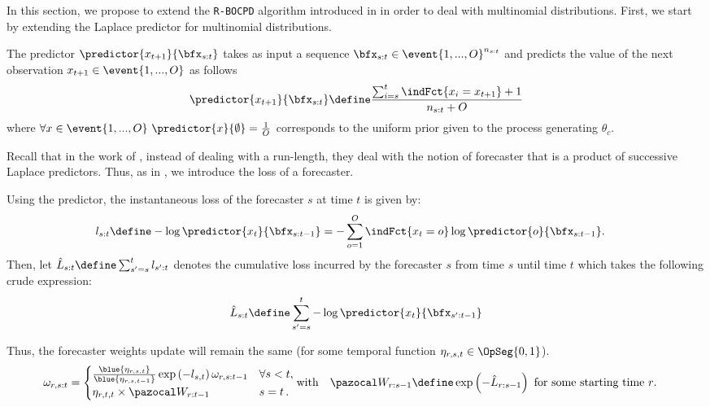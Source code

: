 \documentclass{article} %
\begin{document}
In this section, we propose to extend the \texttt{R-BOCPD} algorithm introduced in \cite{alami20a} in order to deal with multinomial distributions. First, we start by extending the Laplace predictor for multinomial distributions.


\begin{definition}
    \label{LaplacePred}
	The predictor $\predictor{x_{t+1}}{\bfx_{s:t}}$ takes as input a sequence $\bfx_{s:t} \in \event{1,..., O}^{n_{s:t}}$  and predicts the value of the next observation $x_{t+1} \in \event{1,..., O}$ as follows
	\begin{align}
	\predictor{x_{t+1}}{\bfx_{s:t}}  \define 
	\frac{\sum_{i=s}^{t} \indFct{x_i = x_{t+1}}   + 1 }{n_{s:t} + O } 
	\label{Eq::Forecaster}
  \end{align}
		\label{Def_LapPredic}
where $\forall  x \in \event{1,..., O} \ \predictor{x}{\emptyset}  = \frac{1}{O}$ corresponds to the uniform prior given to the process generating  $\theta_c$.
\end{definition}

Recall that in the work of \cite{alami20a}, instead of dealing with a run-length, they deal with the notion of forecaster that is a product of successive Laplace predictors. Thus, as in \cite{alami20a}, we introduce the loss of a forecaster. 

\begin{definition}
Using the predictor, the instantaneous loss of the forecaster $s$ at time $t$ is given by:
\begin{align*}
 l_{s:t} &\define 
 -\log \predictor{x_{t}}{\bfx_{s:t-1}} = - \sum_{o=1}^O \indFct{x_{t} = o}  \log \predictor{o}{\bfx_{s:t-1}}.
\end{align*}
Then, let $\hat{L}_{s:t}\define \sum_{s'=s}^t l_{s':t}$ denotes the cumulative loss incurred by the forecaster $s$ from time $s$ until time $t$ which takes the following crude expression:
\begin{align}
    \hat{L}_{s:t}\define \sum_{s'=s}^t -\log \predictor{x_{t}}{\bfx_{s':t-1}}
    \label{Eq::cumulLoss}
\end{align}
    
\end{definition}

Thus, the forecaster weights update will remain the same (for some temporal function $\eta_{r,s,t}\in \OpSeg{0,1}$).
\begin{align}
    \omega_{r,s:t} & = \begin{cases}
\frac{\blue{\eta_{r,s,t}}}{\blue{\eta_{r,s,t-1}}}	 \exp \left(-l_{s,t} \right) \omega_{r,s:t-1} & \forall s<t,\\
    \eta_{r,t,t} \times \pW_{r:t-1} & \text{}s=t\,.
    \label{eq::weight}
\end{cases} \text{with} \quad \pW_{r:s-1} \define  \exp \left(-\hat{L}_{r:s-1} \right) \ \text{for some starting time $r$.}
\end{align}
\end{document}
